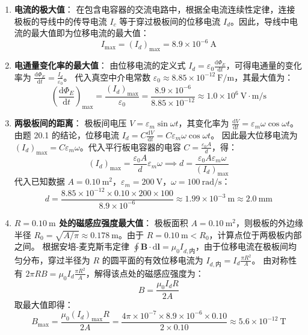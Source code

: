 \begin{solution}
\begin{enumerate}
    \item[(a)] \textbf{电流的极大值}：
    在包含电容器的交流电路中，根据全电流连续性定律，连接极板的导线中的传导电流 $I_c$ 等于穿过极板间的位移电流 $I_d$。因此，导线中电流的最大值即为位移电流的最大值：
    $$ I_{\max} = (I_d)_{\max} = 8.9 \times 10^{-6} \ \mathrm{A} $$

    \item[(b)] \textbf{电通量变化率的最大值}：
    由位移电流的定义式 $I_d = \varepsilon_0 \frac{\mathrm{d}\Phi_E}{\mathrm{d}t}$，可得电通量的变化率为 $\frac{\mathrm{d}\Phi_E}{\mathrm{d}t} = \frac{I_d}{\varepsilon_0}$。
    代入真空中介电常数 $\varepsilon_0 \approx 8.85 \times 10^{-12} \ \mathrm{F/m}$，其最大值为：
    $$ \left( \frac{\mathrm{d}\Phi_E}{\mathrm{d}t} \right)_{\max} = \frac{(I_d)_{\max}}{\varepsilon_0} = \frac{8.9 \times 10^{-6}}{8.85 \times 10^{-12}} \approx 1.0 \times 10^6 \ \mathrm{V \cdot m/s} $$

    \item[(c)] \textbf{两极板间的距离}：
    极板间电压 $V = \varepsilon_m \sin \omega t$，其变化率为 $\frac{\mathrm{d}V}{\mathrm{d}t} = \varepsilon_m \omega \cos \omega t$。
    由题 20.1 的结论，位移电流 $I_d = C \frac{\mathrm{d}V}{\mathrm{d}t} = C \varepsilon_m \omega \cos \omega t$。
    因此最大位移电流为 $(I_d)_{\max} = C \varepsilon_m \omega$。代入平行板电容器的电容 $C = \frac{\varepsilon_0 A}{d}$，得：
    $$ (I_d)_{\max} = \frac{\varepsilon_0 A}{d} \varepsilon_m \omega \implies d = \frac{\varepsilon_0 A \varepsilon_m \omega}{(I_d)_{\max}} $$
    代入已知数据 $A = 0.10 \ \mathrm{m^2}$，$\varepsilon_m = 200 \ \mathrm{V}$，$\omega = 100 \ \mathrm{rad/s}$：
    $$ d = \frac{8.85 \times 10^{-12} \times 0.10 \times 200 \times 100}{8.9 \times 10^{-6}} \approx 1.99 \times 10^{-3} \ \mathrm{m} \approx 2.0 \ \mathrm{mm} $$

    \item[(d)] \textbf{$R = 0.10 \ \mathrm{m}$ 处的磁感应强度最大值}：
    极板面积 $A = 0.10 \ \mathrm{m^2}$，则极板的外边缘半径 $R_0 = \sqrt{A/\pi} \approx 0.178 \ \mathrm{m}$。由于 $R = 0.10 \ \mathrm{m} < R_0$，计算点位于两极板内部之间。
    根据安培-麦克斯韦定律 $\oint \boldsymbol{B} \cdot \mathrm{d}\boldsymbol{l} = \mu_0 I_{d,\text{内}}$，由于位移电流在极板间均匀分布，穿过半径为 $R$ 的圆平面的有效位移电流为 $I_{d,\text{内}} = I_d \frac{\pi R^2}{A}$。
    由对称性有 $2\pi R B = \mu_0 I_d \frac{\pi R^2}{A}$，解得该点处的磁感应强度为：
    $$ B = \frac{\mu_0 I_d R}{2 A} $$
    取最大值即得：
    $$ B_{\max} = \frac{\mu_0 (I_d)_{\max} R}{2 A} = \frac{4\pi \times 10^{-7} \times 8.9 \times 10^{-6} \times 0.10}{2 \times 0.10} \approx 5.6 \times 10^{-12} \ \mathrm{T} $$
\end{enumerate}
\end{solution}

